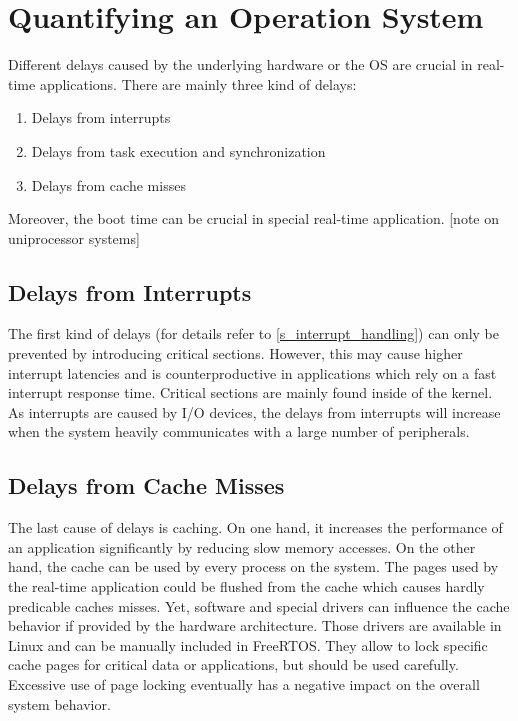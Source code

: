 \section{Quantifying an Operation System}
Different delays caused by the underlying hardware or the \ac{OS} are crucial in real-time applications.
There are mainly three kind of delays:
\begin{enumerate}
	\item Delays from interrupts
	\item Delays from task execution and synchronization
	\item Delays from cache misses
\end{enumerate}
Moreover, the boot time can be crucial in special real-time application.
[note on uniprocessor systems]

\subsection{Delays from Interrupts}
The first kind of delays (for details refer to \ref{s_interrupt_handling}) can only be prevented by introducing critical sections. 
However, this may cause higher interrupt latencies and is counterproductive in applications which rely on a fast interrupt response time.
Critical sections are mainly found inside of the kernel. 
As interrupts are caused by \ac{I/O} devices, the delays from interrupts will increase when the system heavily communicates with a large number of peripherals. 

\subsection{Delays from Cache Misses}
The last cause of delays is caching.
On one hand, it increases the performance of an application significantly by reducing slow memory accesses. 
On the other hand, the cache can be used by every process on the system.
The pages used by the real-time application could be flushed from the cache which causes hardly predicable caches misses.
Yet, software and special drivers can influence the cache behavior if provided by the hardware architecture.
Those drivers are available in Linux and can be manually included in FreeRTOS.
They allow to lock specific cache pages for critical data or applications, but should be used carefully.
Excessive use of page locking eventually has a negative impact on the overall system behavior.

